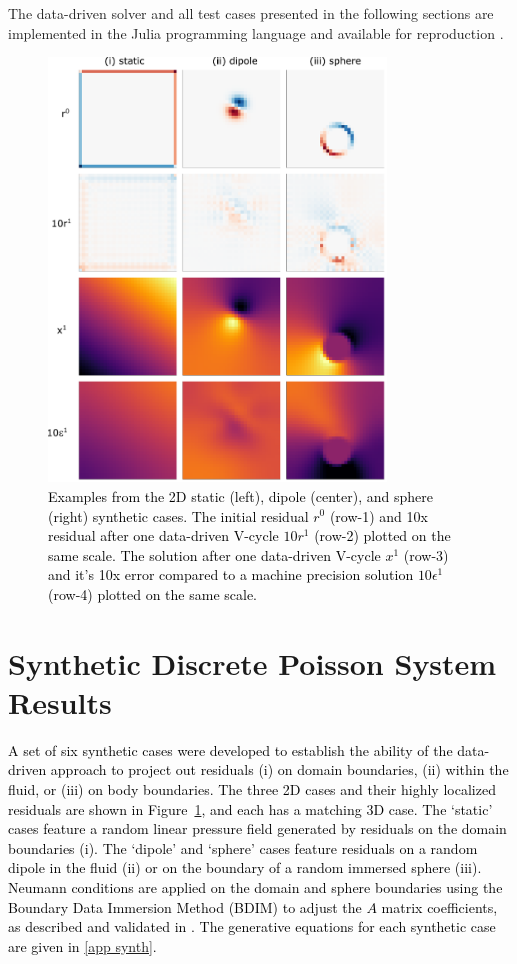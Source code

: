 \documentclass[]{elsarticle}
\begin{document}
The data-driven solver and all test cases presented in the following sections are implemented in the Julia programming language \cite{bezanson2017julia} and available for reproduction \cite{weymouth2021julia}.

\begin{figure}
    \centering
    \includegraphics[width=0.8\textwidth]{figures/synthetic}
    \caption{\textcolor{black}{Examples from the 2D static (left), dipole (center), and sphere (right) synthetic cases. The initial residual $r^0$ (row-1) and 10x residual after one data-driven V-cycle $10r^1$ (row-2) plotted on the same scale. The solution after one data-driven V-cycle $x^1$ (row-3) and it's 10x error compared to a machine precision solution $10\epsilon^1$ (row-4) plotted on the same scale.}}
    \label{fig:synthetic cases}
\end{figure}

\section{Synthetic Discrete Poisson System Results}

\textcolor{black}{A set of six synthetic cases were developed to establish the ability of the data-driven approach to project out residuals (i) on domain boundaries, (ii) within the fluid, or (iii) on body boundaries. The three 2D cases and their highly localized residuals are shown in Figure~\ref{fig:synthetic cases}, and each has a matching 3D case. The `static' cases feature a random linear pressure field generated by residuals on the domain boundaries (i). The `dipole' and `sphere' cases feature residuals on a random dipole in the fluid (ii) or on the boundary of a random immersed sphere (iii). Neumann conditions are applied on the domain and sphere boundaries using the Boundary Data Immersion Method (BDIM) to adjust the $A$ matrix coefficients, as described and validated in \cite{maertens2015accurate,Lauber2022}. The  generative equations for each synthetic case are given in \ref{app synth}.}
\end{document}
